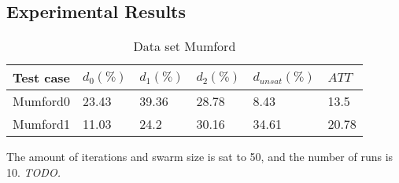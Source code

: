 \subsection{Experimental Results}
\label{subsec:scalabilityExperiments_results}




\begin{table}[H]
    \centering
    \hspace*{-1.0cm}
    \begin{tabular}{|l|l|l|l|l|l|}
        \hline
        Test case &  $d_0(\%)$ & $d_1(\%)$ & $d_2(\%)$ & $d_{unsat}(\%)$ & $ATT$\\
        \hline
        Mumford0 & 23.43 & 39.36 & 28.78 & 8.43 & 13.5\\
        Mumford1 & 11.03 & 24.2 & 30.16 & 34.61 & 20.78\\
        \hline
    \end{tabular}
    \caption{Data set Mumford}
\end{table}
The amount of iterations and swarm size is sat to 50, and the number of runs is 10. \emph{\color{blue} TODO.}